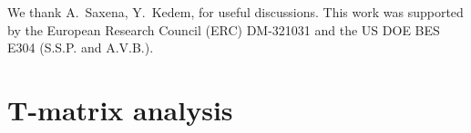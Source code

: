 \documentclass[twocolumn,showpacs,floatfix,nofootinbib,longbibliography]{revtex4-1}
\begin{document}
We thank  A.~Saxena, Y.~Kedem, for useful discussions. This work was supported by the European Research Council (ERC) DM-321031 and the US DOE BES E304 (S.S.P. and A.V.B.). 



%



\appendix 

\section{T-matrix analysis} \label{sec:appendixTMatrix}
\end{document}
